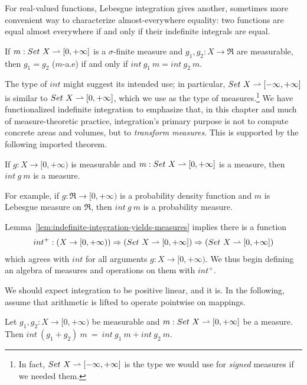 For real-valued functions, Lebesgue integration gives another, sometimes more convenient way to characterize almost-everywhere equality: two functions are equal almost everywhere if and only if their indefinite integrals are equal.
\begin{lemma}
\label{lem:real-almost-everywhere-equality}
If $m : Set~X \rightharpoonup [0,+\infty]$ is a $\sigma$-finite measure and $g_1,g_2 : X \to \Re$ are measurable, then $g_1 = g_2$ ($m$-a.e) if and only if $int~g_1~m = int~g_2~m$.
\end{lemma}

The type of $int$ might suggest its intended use; in particular, $Set~X \rightharpoonup [-\infty,+\infty]$ is similar to $Set~X \rightharpoonup [0,+\infty]$, which we use as the type of measures.\footnote{In fact, $Set~X \rightharpoonup [-\infty,+\infty]$ is the type we would use for \emph{signed} measures if we needed them.}
We have functionalized indefinite integration to emphasize that, in this chapter and much of measure-theoretic practice, integration's primary purpose is not to compute concrete areas and volumes, but to \emph{transform measures}.
This is supported by the following imported theorem.

\begin{lemma}
\label{lem:indefinite-integration-yields-measures}
If $g : X \to [0,+\infty)$ is measurable and $m : Set~X \rightharpoonup [0,+\infty]$ is a measure, then $int~g~m$ is a measure.
\end{lemma}

For example, if $g : \Re \to [0,+\infty)$ is a probability density function and $m$ is Lebesgue measure on $\Re$, then $int~g~m$ is a probability measure.

Lemma~\ref{lem:indefinite-integration-yields-measures} implies there is a function
\begin{equation}
\begin{aligned}
	int^+ : (X \to [0,+\infty)) \Rightarrow (Set~X \rightharpoonup [0,+\infty]) \Rightarrow (Set~X \rightharpoonup [0,+\infty])
\end{aligned}
\end{equation}
which agrees with $int$ for all arguments $g : X \to [0,+\infty)$.
We thus begin defining an algebra of measures and operations on them with $int^+$.

We should expect integration to be positive linear, and it is.
In the following, assume that arithmetic is lifted to operate pointwise on mappings.

\begin{lemma}
\label{lem:int-distributes-over-addition}
Let $g_1,g_2 : X \to [0,+\infty)$ be measurable and $m : Set~X \rightharpoonup [0,+\infty]$ be a measure.
Then $int~(g_1 + g_2)~m\ =\ int~g_1~m + int~g_2~m$.
\end{lemma}

